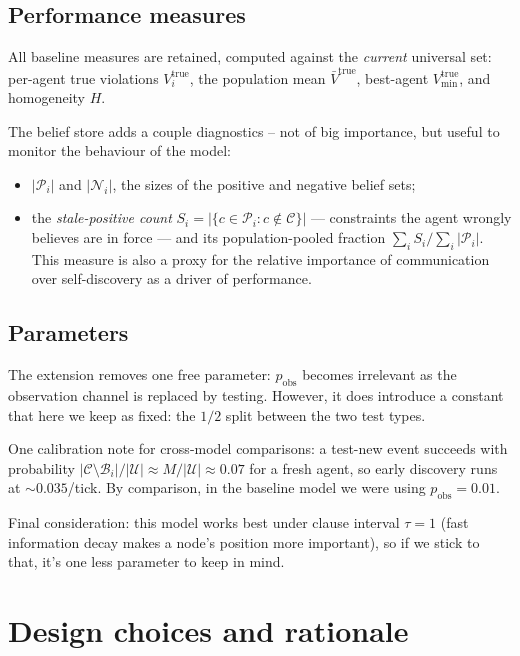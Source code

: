 \documentclass{article}
\begin{document}
\subsection{Performance measures}

All baseline measures are retained, computed against the \emph{current} universal set: per-agent true violations $V^{\text{true}}_i$, the population mean $\bar V^{\text{true}}$, best-agent $V^{\text{true}}_{\min}$, and homogeneity $H$. 

The belief store adds a couple diagnostics -- not of big importance, but useful to monitor the behaviour of the model:
\begin{itemize}
  \item $|\mathcal{P}_i|$ and $|\mathcal{N}_i|$, the sizes of the positive and negative belief sets;
  \item the \emph{stale-positive count} $S_i = |\{ c \in \mathcal{P}_i : c \notin \mathcal{C} \}|$ --- constraints the agent wrongly believes are in force --- and its population-pooled fraction $\sum_i S_i / \sum_i |\mathcal{P}_i|$. This measure is also a proxy for the relative importance of communication over self-discovery as a driver of performance.
\end{itemize}

\subsection{Parameters}

The extension removes one free parameter: $p_{\text{obs}}$ becomes irrelevant as the observation channel is replaced by testing. However, it does introduce a constant that here we keep as fixed: the $1/2$ split between the two test types.

One calibration note for cross-model comparisons: a test-new event succeeds with probability $|\mathcal{C} \setminus \mathcal{B}_i| / |\mathcal{U}| \approx M/|\mathcal{U}| \approx 0.07$ for a fresh agent, so early discovery runs at ${\sim}0.035$/tick. By comparison, in the baseline model we were using $p_{\text{obs}} = 0.01$.

Final consideration: this model works best under clause interval  $\tau=1$ (fast information decay makes a node's position more important), so if we stick to that, it's one less parameter to keep in mind.


\section{Design choices and rationale}\label{sec:design}
\end{document}
